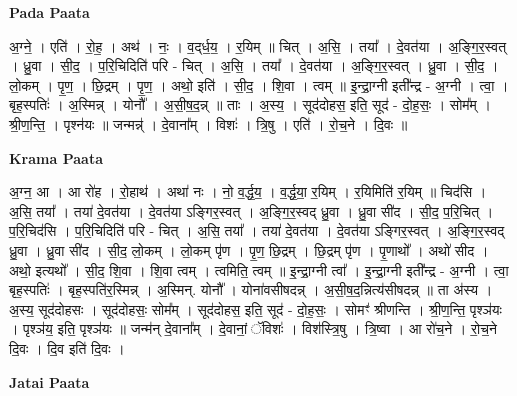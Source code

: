 \documentclass[17pt]{extarticle}
\begin{document}
\textbf{Pada Paata} \newline

अ॒ग्ने॒ । एति॑ । रो॒ह॒ । अथ॑ । नः॒ । व॒द्‌र्ध॒य॒ । र॒यिम् ॥ चित् । अ॒सि॒ । तया᳚ । दे॒वत॑या । अ॒ङ्गि॒र॒स्वत् । ध्रु॒वा । सी॒द॒ । प॒रि॒चिदिति॑ परि - चित् । अ॒सि॒ । तया᳚ । दे॒वत॑या । अ॒ङ्गि॒र॒स्वत् । ध्रु॒वा । सी॒द॒ । लो॒कम् । पृ॒ण॒ । छि॒द्रम् । पृ॒ण॒ । अथो॒ इति॑ । सी॒द॒ । शि॒वा । त्वम् ॥ इ॒न्द्रा॒ग्नी इती᳚न्द्र - अ॒ग्नी । त्वा॒ । बृह॒स्पतिः॑ । अ॒स्मिन्न् । योनौ᳚ । अ॒सी॒ष॒द॒न्न् ॥ ताः । अ॒स्य॒ । सूद॑दोहस॒ इति॒ सूद॑ - दो॒ह॒सः॒ । सोम᳚म् । श्री॒ण॒न्ति॒ । पृश्न॑यः ॥ जन्मन्न्॑ । दे॒वाना᳚म् । विशः॑ । त्रि॒षु । एति॑ । रो॒च॒ने । दि॒वः ॥  \newline


\textbf{Krama Paata} \newline

अ॒ग्न॒ आ । आ रो॑ह । रो॒हाथ॑ । अथा॑ नः । नो॒ व॒र्द्ध॒य॒ । व॒र्द्ध॒या॒ र॒यिम् । र॒यिमिति॑ र॒यिम् ॥ चिद॑सि । अ॒सि॒ तया᳚ । तया॑ दे॒वत॑या । दे॒वत॑या ऽङ्गिर॒स्वत् । अ॒ङ्गि॒र॒स्वद् ध्रु॒वा । ध्रु॒वा सी॑द । सी॒द॒ प॒रि॒चित् । प॒रि॒चिद॑सि । प॒रि॒चिदिति॑ परि - चित् । अ॒सि॒ तया᳚ । तया॑ दे॒वत॑या । दे॒वत॑या ऽङ्गिर॒स्वत् । अ॒ङ्गि॒र॒स्वद् ध्रु॒वा । ध्रु॒वा सी॑द । सी॒द॒ लो॒कम् । लो॒कम् पृ॑ण । पृ॒ण॒ छि॒द्रम् । छि॒द्रम् पृ॑ण । पृ॒णाथो᳚ । अथो॑ सीद । अथो॒ इत्यथो᳚ । सी॒द॒ शि॒वा । शि॒वा त्वम् । त्वमिति॒ त्वम् ॥ इ॒न्द्रा॒ग्नी त्वा᳚ । इ॒न्द्रा॒ग्नी इती᳚न्द्र - अ॒ग्नी । त्वा॒ बृह॒स्पतिः॑ । बृह॒स्पति॑र॒स्मिन्न् । अ॒स्मिन्. योनौ᳚ । योना॑वसीषदन्न् । अ॒सी॒ष॒द॒न्नित्य॑सीषदन्न् ॥ ता अ॑स्य । अ॒स्य॒ सूद॑दोहसः । सूद॑दोहसः॒ सोम᳚म् । सूद॑दोहस॒ इति॒ सूद॑ - दो॒ह॒सः॒ । सोमꣳ॑ श्रीणन्ति । श्री॒ण॒न्ति॒ पृश्ञ॑यः । पृश्ञ॑य॒ इति॒ पृश्ञ॑यः ॥ जन्म॑न् दे॒वाना᳚म् । दे॒वानां॒ ॅविशः॑ । विश॑स्त्रि॒षु । त्रि॒ष्वा । आ रो॑च॒ने । रो॒च॒ने दि॒वः । दि॒व इति॑ दि॒वः । \newline

\textbf{Jatai Paata} \newline
\end{document}
